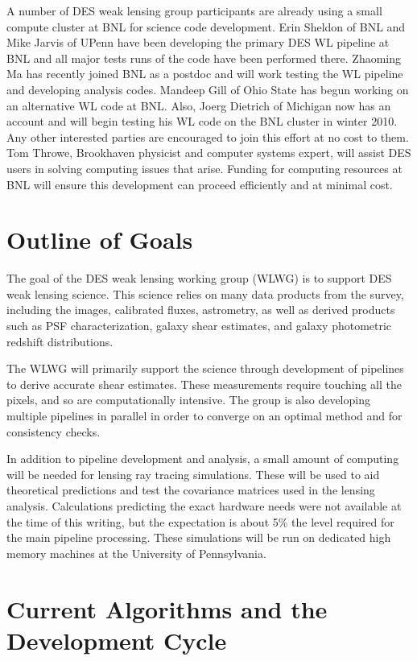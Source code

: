 \documentclass[12pt]{article}
\begin{document}
A number of DES weak lensing group participants are already using a small
compute cluster at BNL for science code development.  Erin Sheldon of BNL and
Mike Jarvis of UPenn have been developing the primary DES WL pipeline at BNL
and all major tests runs of the code have been performed there.  Zhaoming Ma
has recently joined BNL as a postdoc and will work testing the WL pipeline and
developing analysis codes.  Mandeep Gill of Ohio State has begun working on an
alternative WL code at BNL.  Also, Joerg Dietrich of Michigan now has an
account and will begin testing his WL code on the BNL cluster in winter 2010.
Any other interested parties are encouraged to join this effort at no cost to
them.  Tom Throwe, Brookhaven physicist and computer systems expert, will
assist DES users in solving computing issues that arise.  Funding for computing
resources at BNL will ensure this development can proceed efficiently and at
minimal cost.


\section{Outline of Goals}

The goal of the DES weak lensing working group (WLWG) is to support DES weak
lensing science.  This science relies on many data products from the survey,
including the images, calibrated fluxes, astrometry, as well as derived
products such as PSF characterization, galaxy shear estimates, and galaxy
photometric redshift distributions.

The WLWG will primarily support the science through development of pipelines to
derive accurate shear estimates.  These measurements require touching all the
pixels, and so are computationally intensive.  The group is also developing
multiple pipelines in parallel in order to converge on an optimal method and
for consistency checks.  

In addition to pipeline development and analysis, a small amount of computing
will be needed for lensing ray tracing simulations.  These will be used to aid
theoretical predictions and test the covariance matrices used in the lensing
analysis.  Calculations predicting the exact hardware needs were not available
at the time of this writing, but the expectation is about 5\% the level
required for the main pipeline processing.  These simulations will be run on
dedicated high memory machines at the University of Pennsylvania.


\section{Current Algorithms and the Development Cycle}
\end{document}
